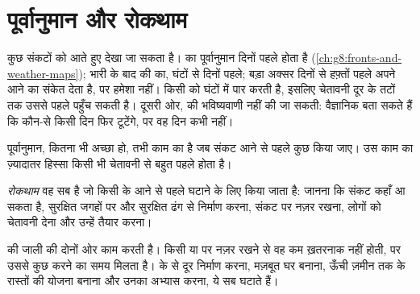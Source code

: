 \section{पूर्वानुमान और रोकथाम}

कुछ संकटों को आते हुए देखा जा सकता है।  का पूर्वानुमान दिनों पहले होता है
(\cref{ch:g8:fronts-and-weather-maps}); भारी  के बाद की  का, घंटों से दिनों
पहले; बड़ा  अक्सर दिनों से हफ़्तों पहले अपने आने का संकेत देता है, पर हमेशा नहीं।
 किसी  को घंटों में पार करती है, इसलिए चेतावनी दूर के तटों तक उससे पहले पहुँच
सकती है। दूसरी ओर,  की भविष्यवाणी नहीं की जा सकती: वैज्ञानिक बता सकते हैं कि कौन-से
 किसी दिन फिर टूटेंगे, पर वह दिन कभी
नहीं।

पूर्वानुमान, कितना भी अच्छा हो, तभी काम का है जब संकट आने से पहले कुछ किया जाए। उस काम
का ज़्यादातर हिस्सा किसी भी चेतावनी से बहुत पहले होता है।

\begin{definition}[रोकथाम]\label{def:g9:natural-risks:prevention}
\emph{रोकथाम} वह सब है जो किसी  के आने से पहले 
घटाने के लिए किया जाता है: जानना कि संकट कहाँ आ सकता है, सुरक्षित जगहों पर और सुरक्षित
ढंग से निर्माण करना, संकट पर नज़र रखना, लोगों को चेतावनी देना और उन्हें तैयार
करना।
\end{definition}

  की जाली की दोनों ओर काम करती है। किसी  या  पर नज़र रखने से वह
कम ख़तरनाक नहीं होती, पर उससे कुछ करने का समय मिलता है।  के  से दूर निर्माण करना,
मज़बूत घर बनाना, ऊँची ज़मीन तक के रास्तों की योजना बनाना और उनका अभ्यास करना, ये सब
 घटाते हैं।


